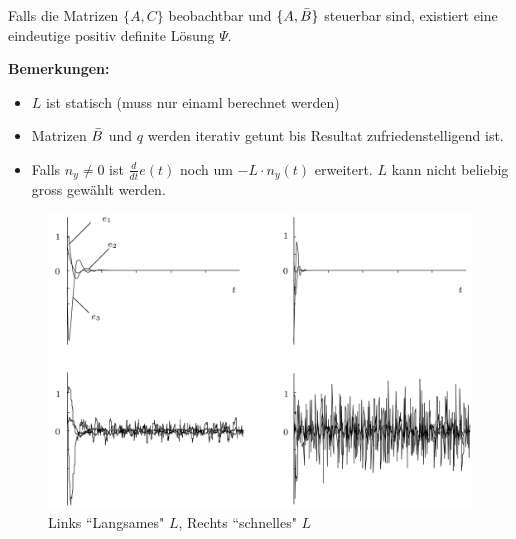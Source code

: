             Falls die Matrizen $\{A,C\}$ beobachtbar und $\{A,\Bar{B}\}$ steuerbar sind, existiert eine eindeutige positiv definite Lösung $\Psi$.
            
            \textbf{Bemerkungen:}
            \begin{itemize}
                \item $L$ ist statisch (muss nur einaml berechnet werden)
                \item Matrizen $\Bar{B}$ und $q$ werden iterativ getunt bis Resultat zufriedenstelligend ist.
                \item Falls $n_y\neq0$ ist $\frac{d}{dt}e(t)$ noch um $-L\cdot n_y(t)$ erweitert. $L$ kann nicht beliebig gross gewählt werden.
            \end{itemize}
            
            \begin{figure}[H]
                \centering
                \includegraphics[width = 0.7\linewidth]{images/09/L_noise.jpeg}
                \caption{Links ``Langsames" $L$, Rechts ``schnelles" $L$}
            \end{figure}